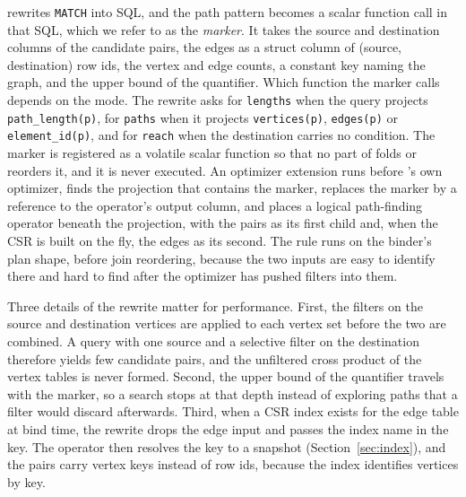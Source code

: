 \duckpgq rewrites \texttt{MATCH} into SQL, and the path pattern becomes a scalar function call in that SQL, which we refer to as
the \emph{marker}. It takes the source and destination columns of the candidate pairs, the edges as a struct column of
(source, destination) row ids, the vertex and edge counts, a constant key naming the graph, and the upper bound of the
quantifier. Which function the marker calls depends on the mode. The rewrite asks for \texttt{lengths} when the query projects
\texttt{path\_length(p)}, for \texttt{paths} when it projects \texttt{vertices(p)}, \texttt{edges(p)} or
\texttt{element\_id(p)}, and for \texttt{reach} when the destination carries no condition. The marker is registered as a volatile scalar function so that no
part of \duckdb folds or reorders it, and it is never executed. An optimizer extension runs before \duckdb's own
optimizer, finds the projection that contains the marker, replaces the marker by a reference to the operator's output
column, and places a logical path-finding operator beneath the projection, with the pairs as its first child and, when
the CSR is built on the fly, the edges as its second. The rule runs on the binder's plan shape, before join
reordering, because the two inputs are easy to identify there and hard to find after the optimizer has pushed filters
into them.

Three details of the rewrite matter for performance. First, the filters on the source and destination vertices are
applied to each vertex set before the two are combined. A query with one source and a selective filter on the
destination therefore yields few candidate pairs, and the unfiltered cross product of the vertex tables is never
formed.
Second, the upper bound of the quantifier travels with the marker, so a search stops at that depth instead of
exploring paths that a filter would discard afterwards. Third, when a CSR index exists for the edge table at bind
time, the rewrite drops the edge input and passes the index name in the key. The operator then resolves the key to a
snapshot (Section~\ref{sec:index}), and the pairs carry vertex keys instead of row ids, because the index identifies
vertices by key.

